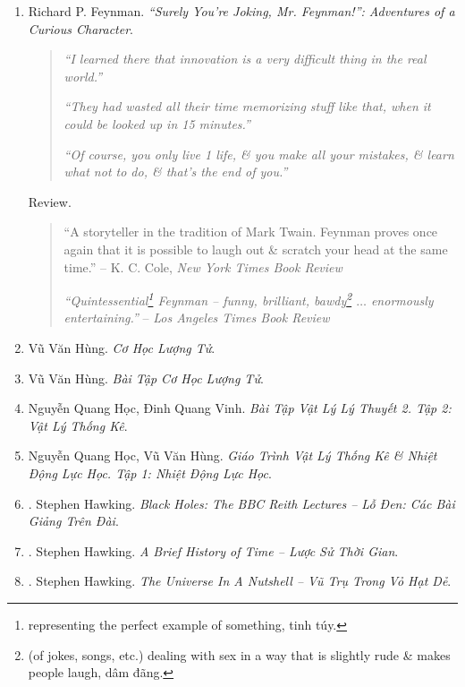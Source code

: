 \documentclass{article}
\begin{document}
\begin{enumerate}
	\item {\sc Richard P. Feynman}. {\it``Surely You're Joking, Mr. Feynman!'': Adventures of a Curious Character}.
	\begin{quotation}
		{\it``I learned there that innovation is a very difficult thing in the real world.''}
		
		{\it``They had wasted all their time memorizing stuff like that, when it could be looked up in 15 minutes.''}
		
		{\it``Of course, you only live 1 life, \& you make all your mistakes, \& learn what not to do, \& that's the end of you.''}
	\end{quotation}
	{\sf Review.}
	\begin{quotation}
		``A storyteller in the tradition of {\sc Mark Twain}. {\sf Feynman} proves once again that it is possible to laugh out \& scratch your head at the same time.'' -- K. C. Cole, {\it New York Times Book Review}
		
		{\it``Quintessential\footnote{representing the perfect example of something, tinh túy.} Feynman -- funny, brilliant, bawdy\footnote{(of jokes, songs, etc.) dealing with sex in a way that is slightly rude \& makes people laugh, dâm đãng.} $\ldots$ enormously entertaining.''} -- {\it Los Angeles Times Book Review}
	\end{quotation}	
	
	\item Vũ Văn Hùng. {\it Cơ Học Lượng Tử}.
	
	\item Vũ Văn Hùng. {\it Bài Tập Cơ Học Lượng Tử}.
	
	\item Nguyễn Quang Học, Đinh Quang Vinh. {\it Bài Tập Vật Lý Lý Thuyết 2. Tập 2: Vật Lý Thống Kê}.
	
	\item Nguyễn Quang Học, Vũ Văn Hùng. {\it Giáo Trình Vật Lý Thống Kê \& Nhiệt Động Lực Học. Tập 1: Nhiệt Động Lực Học}.
	
	\item \cite{Hawking_bbc}. Stephen Hawking. {\it Black Holes: The BBC Reith Lectures -- Lỗ Đen: Các Bài Giảng Trên Đài}.\hfill{\sf[done]}
	
	\item \cite{Hawking_lstg}. Stephen Hawking. {\it A Brief History of Time -- Lược Sử Thời Gian}.\hfill{\sf[done]}
	
	\item \cite{Hawking_vttvhd}. Stephen Hawking. {\it The Universe In A Nutshell -- Vũ Trụ Trong Vỏ Hạt Dẻ}.\hfill{\sf[done]}
	

\end{enumerate}
\end{document}
